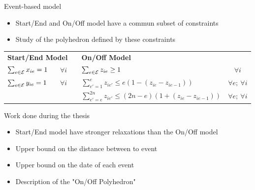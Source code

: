 \begin{frame}{Event-based model }

  \vfill
  \begin{itemize}
  \item Start/End and On/Off model have a commun subset of constraints
  \item Study of the polyhedron defined by these constraints
  \end{itemize}
  
  \vspace{0.5cm}
  \begin{tabularx}{\textwidth}{XclXc}
    \multicolumn{2}{l}{\bf Start/End Model} & &
    \multicolumn{2}{l}{\bf On/Off Model}\\[2mm]
    \scriptsize $\sum_{e\in {\cal E}} x_{ie} =1 $& \scriptsize$ \forall i $& & \scriptsize$\sum_{e \in {\cal E}} z_{ie} \ge 1$& \scriptsize$ \forall i $ \\[2mm]
     \scriptsize $\sum_{e\in {\cal E}} y_{ie} =1 $& \scriptsize$  \forall i$ & & \scriptsize
     \scriptsize $\sum_{e'=1}^{e} z_{ie'} \le e(1-(z_{ie}-z_{ie-1}))$ & \scriptsize$  \forall e;\ \forall i$\\[2mm]
      & & & \scriptsize $\sum_{e'=e}^{2n} z_{ie'} \le (2n-e)(1+(z_{ie}-z_{ie-1})) $& \scriptsize$
      \forall
      e;\ 
      \forall
      i$
    \end{tabularx}
\end{frame}

\begin{frame}{Work done during the thesis}
  \vfill
  \begin{itemize}
  \item Start/End model have stronger relaxations than the On/Off
    model
    \vfill 
  \item Upper bound on the distance between to event
    \vfill
  \item Upper bound on the date of each event
    \vfill
  \item Description of the "On/Off Polyhedron"
  \end{itemize}
  \vfill
\end{frame}

